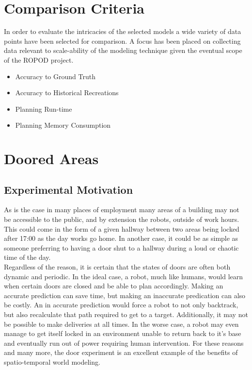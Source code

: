 \section{ Comparison Criteria }
In order to evaluate the intricacies of the selected models a wide variety of
data points have been selected for comparison. A focus has been placed on collecting
data relevant to scale-ability of the modeling technique given the eventual scope of the ROPOD project.

\begin{itemize}

  \item Accuracy to Ground Truth

  \item Accuracy to Historical Recreations

  \item Planning Run-time

  \item Planning Memory Consumption

\end{itemize}


\section{ Doored Areas}

\subsection{ Experimental Motivation }

As is the case in many places of employment many areas of a building may not
be accessible to the public, and by extension the robots, outside of work
hours.  This could come in the form of a given hallway between two areas being
locked after 17:00 as the day works go home. In another case, it could be as
simple as someone preferring to having a door shut to a hallway during a loud
or chaotic time of the day. \\

Regardless of the reason, it is certain that the states of doors are often
both dynamic and periodic. In the ideal case, a robot, much like humans,
would learn when certain doors are closed and be able to plan accordingly.
Making an accurate prediction can save time, but making an inaccurate
predication can also be costly. An in accurate prediction would force a robot
to not only backtrack, but also recalculate that path required to get to a
target. Additionally, it may not be possible to make deliveries at all times.
In the worse case, a robot may even manage to get itself locked in an
environment unable to return back to it's base and eventually run out of power
requiring human intervention. For these reasons and many more, the door
experiment is an excellent example of the benefits of spatio-temporal world
modeling. \\

